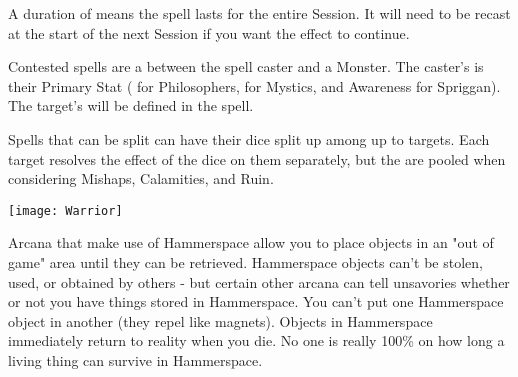 {{    \item A duration of  means the spell lasts for the entire Session.  It will need to be recast at the start of the next Session if you want the effect to continue.
  }




  Contested spells are a \RB between the spell caster and a Monster.  The caster's \RB is their Primary Stat ( \INT for Philosophers, \FOC for Mystics, and Awareness for Spriggan).  The target's \RB will be defined in the spell.  


  Spells that can be split can have their dice split up among up to \DICE targets.  Each target resolves the effect of the dice on them separately, but the \DICE are pooled when considering Mishaps, Calamities, and Ruin.


\cbreak

  \begin{center}
  \texttt{[image: Warrior]}
  \end{center}



  Arcana that make use of Hammerspace allow you to place objects in an "out of game" area until they can be retrieved.  Hammerspace objects can't be stolen, used, or obtained by others - but certain other arcana can tell unsavories whether or not you have things stored in Hammerspace.  You can't put one Hammerspace object in another (they repel like magnets). Objects in Hammerspace immediately return to reality when you die.  No one is really 100\% on how long a living thing can survive in Hammerspace.  

}
